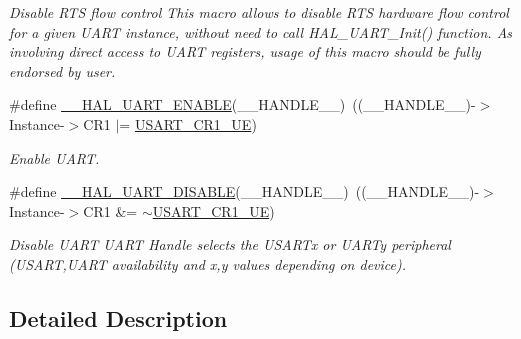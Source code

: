 \begin{DoxyCompactItemize}
\begin{DoxyCompactList}\small\item\em Disable R\-T\-S flow control This macro allows to disable R\-T\-S hardware flow control for a given U\-A\-R\-T instance, without need to call H\-A\-L\-\_\-\-U\-A\-R\-T\-\_\-\-Init() function. As involving direct access to U\-A\-R\-T registers, usage of this macro should be fully endorsed by user. \end{DoxyCompactList}\item 
\#define \hyperlink{group___u_a_r_t___exported___macros_ga49eb5ea4996a957afeb8be2793ba3fe9}{\-\_\-\-\_\-\-H\-A\-L\-\_\-\-U\-A\-R\-T\-\_\-\-E\-N\-A\-B\-L\-E}(\-\_\-\-\_\-\-H\-A\-N\-D\-L\-E\-\_\-\-\_\-)~((\-\_\-\-\_\-\-H\-A\-N\-D\-L\-E\-\_\-\-\_\-)-\/$>$Instance-\/$>$C\-R1 $\vert$=  \hyperlink{group___peripheral___registers___bits___definition_ga2bb650676aaae4a5203f372d497d5947}{U\-S\-A\-R\-T\-\_\-\-C\-R1\-\_\-\-U\-E})
\begin{DoxyCompactList}\small\item\em Enable U\-A\-R\-T. \end{DoxyCompactList}\item 
\#define \hyperlink{group___u_a_r_t___exported___macros_gad2f9fbdb4adf3a09939e201eaeea072f}{\-\_\-\-\_\-\-H\-A\-L\-\_\-\-U\-A\-R\-T\-\_\-\-D\-I\-S\-A\-B\-L\-E}(\-\_\-\-\_\-\-H\-A\-N\-D\-L\-E\-\_\-\-\_\-)~((\-\_\-\-\_\-\-H\-A\-N\-D\-L\-E\-\_\-\-\_\-)-\/$>$Instance-\/$>$C\-R1 \&=  $\sim$\hyperlink{group___peripheral___registers___bits___definition_ga2bb650676aaae4a5203f372d497d5947}{U\-S\-A\-R\-T\-\_\-\-C\-R1\-\_\-\-U\-E})
\begin{DoxyCompactList}\small\item\em Disable U\-A\-R\-T U\-A\-R\-T Handle selects the U\-S\-A\-R\-Tx or U\-A\-R\-Ty peripheral (U\-S\-A\-R\-T,U\-A\-R\-T availability and x,y values depending on device). \end{DoxyCompactList}\end{DoxyCompactItemize}


\subsection{Detailed Description}


